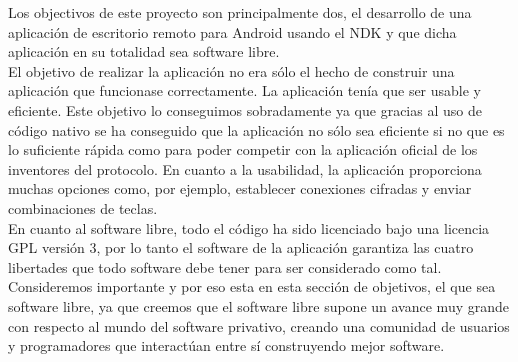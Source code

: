 Los objectivos de este proyecto son principalmente dos, el desarrollo de una aplicación de escritorio remoto para Android usando el NDK y que dicha aplicación en su totalidad sea software libre.\\

El objetivo de realizar la aplicación no era sólo el hecho de construir una aplicación que funcionase correctamente. La aplicación tenía que ser usable y eficiente. Este objetivo lo conseguimos sobradamente ya que gracias al uso de código nativo se ha conseguido que la aplicación no sólo sea eficiente si no que es lo suficiente rápida como para poder competir con la aplicación oficial de los inventores del protocolo. En cuanto a la usabilidad, la aplicación proporciona muchas opciones como, por ejemplo, establecer conexiones cifradas y enviar combinaciones de teclas.\\

En cuanto al software libre, todo el código ha sido licenciado bajo una licencia GPL versión 3, por lo tanto el software de la aplicación garantiza las cuatro libertades que todo software debe tener para ser considerado como tal.\\

Consideremos importante y por eso esta en esta sección de objetivos, el que sea software libre, ya que creemos que el software libre supone un avance muy grande con respecto al mundo del software privativo, creando una comunidad de usuarios y programadores que interactúan entre sí construyendo mejor software. 
